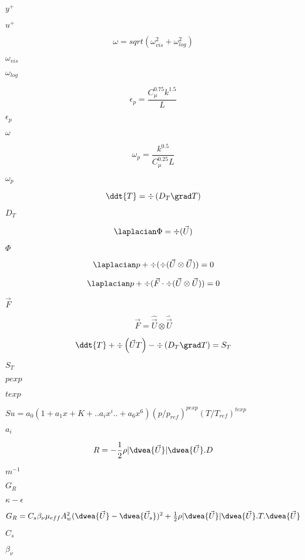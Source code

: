 \documentclass{article}
\begin{document}
$ y^+ $
\pagebreak

$ u^+ $
\pagebreak

\[ \omega = sqrt(\omega_{vis}^2 + \omega_{log}^2) \]
\pagebreak

$ \omega_{vis} $
\pagebreak

$ \omega_{log} $
\pagebreak

\[ \epsilon_p = \frac{C_{\mu}^{0.75} k^{1.5}}{L} \]
\pagebreak

$ \epsilon_p $
\pagebreak

$\omega$
\pagebreak

\[ \omega_p = \frac{k^{0.5}}{C_{\mu}^{0.25} L} \]
\pagebreak

$ \omega_p $
\pagebreak

\[ \ddt{T} = \div \left( D_T \grad T \right) \]
\pagebreak

$ D_T $
\pagebreak

\[ \laplacian \Phi = \div(\vec{U}) \]
\pagebreak

$ \Phi $
\pagebreak

\[ \laplacian p + \div(\div(\vec{U}\otimes\vec{U})) = 0 \]
\pagebreak

\[ \laplacian p + \div(\vec{F}\cdot\div(\vec{U}\otimes\vec{U})) = 0 \]
\pagebreak

$\vec{F}$
\pagebreak

\[ \vec{F} = \hat{\vec{U}}\otimes\hat{\vec{U}} \]
\pagebreak

\[ \ddt{T} + \div \left(\vec{U} T\right) - \div \left(D_T \grad T \right) = S_{T} \]
\pagebreak

$ S_T $
\pagebreak

$ pexp $
\pagebreak

$ texp $
\pagebreak

$ Su = a_{0}(1+a_{1}x+K+..a_{i}x^{i}..+a_{6}x^{6}) (p/p_{ref})^{pexp} (T/T_{ref})^{texp} $
\pagebreak

$ a_{i} $
\pagebreak

\[ R = -\frac{1}{2} \rho \vert \dwea{\vec{U}} \vert \dwea{\vec{U}}.D \]
\pagebreak

$ m^{-1} $
\pagebreak

$ G_{R} $
\pagebreak

$ \kappa-\epsilon $
\pagebreak

$ G_{R} = C_{s}\beta_{\nu} \mu_{eff} A_{w}^{2}(\dwea{\vec{U}}-\dwea{\vec{U}_{s}})^2 + \frac{1}{2} \rho \vert \dwea{\vec{U}} \vert \dwea{\vec{U}}.T.\dwea{\vec{U}} $
\pagebreak

$ C_{s} $
\pagebreak

$ \beta_{\nu} $
\pagebreak
\end{document}
